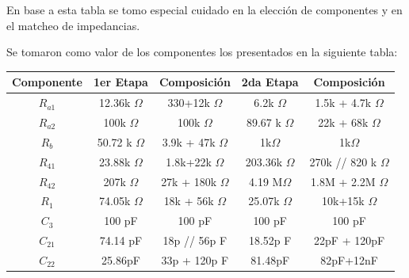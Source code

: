 En base a esta tabla se tomo especial cuidado en la elección de componentes y en el matcheo de impedancias.

Se tomaron como valor de los componentes los presentados en la siguiente tabla:
\begin{table}[H]
\centering
\begin{tabular}{ccccc}
\multicolumn{1}{c}{Componente} & \multicolumn{1}{c}{1er Etapa} & \multicolumn{1}{c}{Composición} & 2da Etapa        & Composición            \\ \hline
$R_{a1}$                          & 12.36k $\Omega$               & 330+12k $\Omega$                & 6.2k $\Omega$    & 1.5k + 4.7k $\Omega$   \\
$R_{a2}$                          & 100k $\Omega$                 & 100k $\Omega$                   & 89.67 k $\Omega$ & 22k + 68k $\Omega$     \\
$R_b$                          & 50.72 k $\Omega$              & 3.9k + 47k $\Omega$             & 1k$\Omega$       & 1k$\Omega$             \\
$R_{41}$                          & 23.88k $\Omega$               & 1.8k+22k $\Omega$               & 203.36k $\Omega$ & 270k // 820 k $\Omega$ \\
$R_{42}$                          & 207k $\Omega$                 & 27k + 180k $\Omega$             & 4.19 M$\Omega$   & 1.8M + 2.2M $\Omega$   \\
$R_1$                          & 74.05k $\Omega$               & 18k + 56k $\Omega$              & 25.07k $\Omega$  & 10k+15k $\Omega$       \\
$C_3$                          & 100 pF                        & 100 pF                          & 100 pF           & 100 pF                 \\
$C_{21}$                          & 74.14 pF                      & 18p // 56p F                    & 18.52p F         & 22pF + 120pF           \\
$C_{22}$                          & 25.86pF                       & 33p + 120p F                    & 81.48pF          & 82pF+12nF             
\end{tabular}
\end{table}


